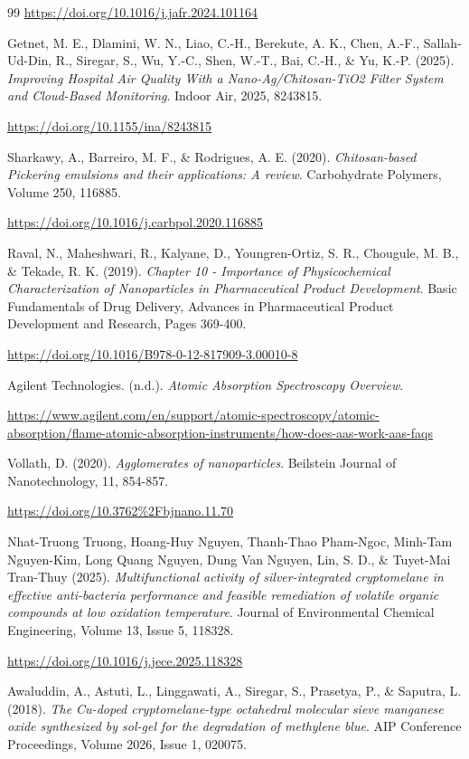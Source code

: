 \documentclass{article} %
\begin{document}
\begin{thebibliography}{99}
\url{https://doi.org/10.1016/j.jafr.2024.101164}

Getnet, M. E., Dlamini, W. N., Liao, C.-H., Berekute, A. K., Chen, A.-F., Sallah-Ud-Din, R., Siregar, S., Wu, Y.-C., Shen, W.-T., Bai, C.-H., \& Yu, K.-P. (2025). \textit{Improving Hospital Air Quality With a Nano-Ag/Chitosan-TiO2 Filter System and Cloud-Based Monitoring}. Indoor Air, 2025, 8243815.

\url{https://doi.org/10.1155/ina/8243815}

Sharkawy, A., Barreiro, M. F., \& Rodrigues, A. E. (2020).  
\textit{Chitosan-based Pickering emulsions and their applications: A review}. Carbohydrate Polymers, Volume 250, 116885.

\url{https://doi.org/10.1016/j.carbpol.2020.116885}

Raval, N., Maheshwari, R., Kalyane, D., Youngren-Ortiz, S. R., Chougule, M. B., \& Tekade, R. K. (2019). \textit{Chapter 10 - Importance of Physicochemical Characterization of Nanoparticles in Pharmaceutical Product Development}. Basic Fundamentals of Drug Delivery, Advances in Pharmaceutical Product Development and Research, Pages 369-400.

\url{https://doi.org/10.1016/B978-0-12-817909-3.00010-8}

Agilent Technologies. (n.d.). \textit{Atomic Absorption Spectroscopy Overview}.

\url{https://www.agilent.com/en/support/atomic-spectroscopy/atomic-absorption/flame-atomic-absorption-instruments/how-does-aas-work-aas-faqs}

Vollath, D. (2020). \textit{Agglomerates of nanoparticles}. Beilstein Journal of Nanotechnology, 11, 854-857.

\url{https://doi.org/10.3762%2Fbjnano.11.70}

Nhat-Truong Truong, Hoang-Huy Nguyen, Thanh-Thao Pham-Ngoc, Minh-Tam Nguyen-Kim, Long Quang Nguyen, Dung Van Nguyen, Lin, S. D., \& Tuyet-Mai Tran-Thuy (2025). \textit{Multifunctional activity of silver-integrated cryptomelane in effective anti-bacteria performance and feasible remediation of volatile organic compounds at low oxidation temperature}. Journal of Environmental Chemical Engineering, Volume 13, Issue 5, 118328.

\url{https://doi.org/10.1016/j.jece.2025.118328}

Awaluddin, A., Astuti, L., Linggawati, A., Siregar, S., Prasetya, P., \& Saputra, L. (2018). \textit{The Cu-doped cryptomelane-type octahedral molecular sieve manganese oxide synthesized by sol-gel for the degradation of methylene blue}. AIP Conference Proceedings, Volume 2026, Issue 1, 020075.


\end{thebibliography}
\end{document}

